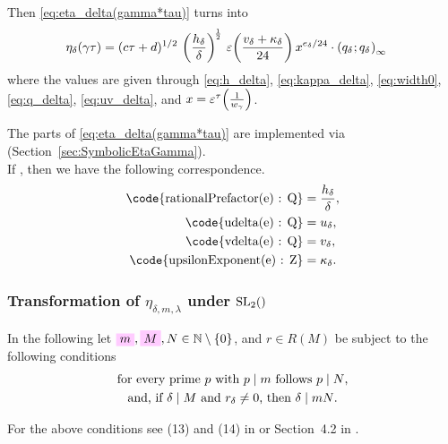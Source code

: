 \documentclass{article}
\begin{document}
Then \eqref{eq:eta_delta(gamma*tau)} turns into
\begin{align}
\eta_\delta(\gamma\tau)
&=
(c \tau+d)^{1/2}
\,
\left(\frac{h_\delta}{\delta}\right)^{\!\frac{1}{2}}
\,
  \unityPower{\frac{v_\delta + \kappa_\delta}{24}}
  x^{e_\delta/24} \cdot \eulerFunction[q_\delta]{}
\label{eq:eta_delta(gamma*tau)-expansion}
\end{align}
where the values are given through \eqref{eq:h_delta},
\eqref{eq:kappa_delta}, \eqref{eq:width0}, \eqref{eq:q_delta},
\eqref{eq:uv_delta}, and $x=\varepsilon^\tau\!\left(\frac{1}{w_\gamma}\right)$.



The parts of \eqref{eq:eta_delta(gamma*tau)} are implemented via
\textcolor{blue}{}
(Section~\ref{sec:SymbolicEtaGamma}).
\\
If , then we have the following
correspondence.
\begin{align*}
\text{\code{rationalPrefactor(e) : Q}} &= \frac{h_\delta}{\delta},\\
\text{\code{udelta(e) : Q}}            &= u_\delta,\\
\text{\code{vdelta(e) : Q}}            &= v_\delta,\\
\text{\code{upsilonExponent(e) : Z}}   &= \kappa_\delta.
\end{align*}






\subsubsection{Transformation of $\eta_{\delta,m,\lambda}$ under
  $\SL2Z$}
  \label{sec:transformation-eta_delta-m-lambda}

In the following let
$\defineNotation[m]{m},
\defineNotation[M]{M},
N \in \setN \setminus \Set{0}$, and
$r \in R(M)$
be subject to the following conditions
\begin{gather}
  \text{for every prime $p$ with $p \mid m$ follows $p \mid N$,}
  \\
  \text{and, if $\delta \mid M$ and $r_\delta\ne0$, then
    $\delta \mid mN$.}
\end{gather}

For the above conditions see (13) and (14) in
\cite{Radu_AlgorithmicApproachRamanujanCongruences_2009} or
Section~4.2 in \cite{Radu_PhD_2010}.
\end{document}
